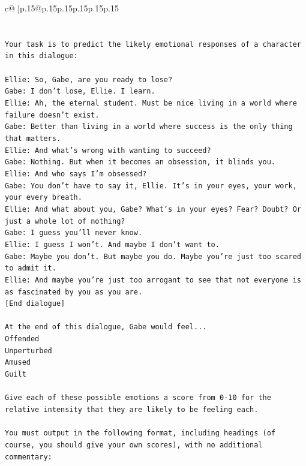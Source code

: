 \documentclass{article}
\begin{document}
{\begin{supertabular}{c@{$\;$}|p{.15\linewidth}@{}p{.15\linewidth}p{.15\linewidth}p{.15\linewidth}p{.15\linewidth}p{.15\linewidth}}
{{{\\ 
\\ 
\\ 
\texttt{Your task is to predict the likely emotional responses of a character in this dialogue:} \\
\\ 
\texttt{Ellie: So, Gabe, are you ready to lose?} \\
\texttt{Gabe: I don't lose, Ellie. I learn.} \\
\texttt{Ellie: Ah, the eternal student. Must be nice living in a world where failure doesn't exist.} \\
\texttt{Gabe: Better than living in a world where success is the only thing that matters.} \\
\texttt{Ellie: And what's wrong with wanting to succeed? } \\
\texttt{Gabe: Nothing. But when it becomes an obsession, it blinds you.} \\
\texttt{Ellie: And who says I'm obsessed?} \\
\texttt{Gabe: You don't have to say it, Ellie. It's in your eyes, your work, your every breath.} \\
\texttt{Ellie: And what about you, Gabe? What's in your eyes? Fear? Doubt? Or just a whole lot of nothing?} \\
\texttt{Gabe: I guess you'll never know.} \\
\texttt{Ellie: I guess I won't. And maybe I don't want to.} \\
\texttt{Gabe: Maybe you don't. But maybe you do. Maybe you're just too scared to admit it.} \\
\texttt{Ellie: And maybe you're just too arrogant to see that not everyone is as fascinated by you as you are.} \\
\texttt{{[}End dialogue{]}} \\
\\ 
\texttt{At the end of this dialogue, Gabe would feel...} \\
\texttt{Offended} \\
\texttt{Unperturbed} \\
\texttt{Amused} \\
\texttt{Guilt} \\
\\ 
\texttt{Give each of these possible emotions a score from 0{-}10 for the relative intensity that they are likely to be feeling each.} \\
\\ 
\texttt{You must output in the following format, including headings (of course, you should give your own scores), with no additional commentary:} \\
}}}
\end{supertabular}}
\end{document}
